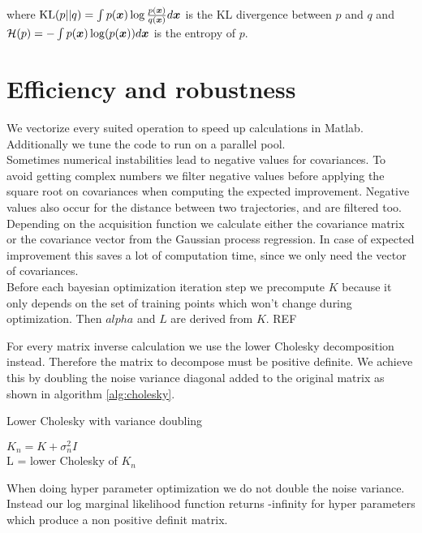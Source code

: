 where $\mathrm{KL}(p||q) = \int p({\boldsymbol{x}}) \log \frac{p({\boldsymbol{x}})}{q({\boldsymbol{x}})} d{\boldsymbol{x}}$ is the KL divergence between $p$ and $q$ and ${\cal H}(p) = -\int p({\boldsymbol{x}})\log(p({\boldsymbol{x}})) d{\boldsymbol{x}}$ is the entropy of $p$.

\section{Efficiency and robustness}
We vectorize every suited operation to speed up calculations in Matlab. Additionally we tune the code to run on a parallel pool.\\

Sometimes numerical instabilities lead to negative values for covariances. To avoid getting complex numbers we filter negative values before applying the square root on covariances when computing the expected improvement. Negative values also occur for the distance between two trajectories, and are filtered too.\\

Depending on the acquisition function we calculate either the covariance matrix or the covariance vector from the Gaussian process regression. In case of expected improvement this saves a lot of computation time, since we only need the vector of covariances.\\

Before each bayesian optimization iteration step we precompute $K$ because it only depends on the set of training points which won't change during optimization. Then $alpha$ and $L$ are derived from $K$. REF

For every matrix inverse calculation we use the lower Cholesky decomposition instead. Therefore the matrix to decompose must be positive definite. We achieve this by doubling the noise variance diagonal added to the original matrix as shown in algorithm \ref{alg:cholesky}.

\begin{algorithm}
    \caption{Lower Cholesky with variance doubling\label{alg:cholesky}}
    \BlankLine
    $K_n = K+\sigma_n^2 I$\\
    L = lower Cholesky of $K_n$\\
\end{algorithm}

When doing hyper parameter optimization we do not double the noise variance. Instead our log marginal likelihood function returns -infinity for hyper parameters which produce a non positive definit matrix.

